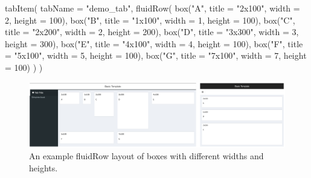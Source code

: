 \documentclass[
  oneside]{book}
\newenvironment{Shaded}{\begin{snugshade}}{\end{snugshade}}
\newcommand{\AttributeTok}[1]{\textcolor[rgb]{0.77,0.63,0.00}{#1}}
\newcommand{\DecValTok}[1]{\textcolor[rgb]{0.00,0.00,0.81}{#1}}
\newcommand{\FunctionTok}[1]{\textcolor[rgb]{0.00,0.00,0.00}{#1}}
\newcommand{\NormalTok}[1]{#1}
\newcommand{\StringTok}[1]{\textcolor[rgb]{0.31,0.60,0.02}{#1}}
\begin{document}
\begin{Shaded}
\begin{Highlighting}[]
\FunctionTok{tabItem}\NormalTok{(}
    \AttributeTok{tabName =} \StringTok{"demo\_tab"}\NormalTok{,}
    \FunctionTok{fluidRow}\NormalTok{(}
      \FunctionTok{box}\NormalTok{(}\StringTok{"A"}\NormalTok{, }\AttributeTok{title =} \StringTok{"2x100"}\NormalTok{, }\AttributeTok{width =} \DecValTok{2}\NormalTok{, }\AttributeTok{height =} \DecValTok{100}\NormalTok{),}
      \FunctionTok{box}\NormalTok{(}\StringTok{"B"}\NormalTok{, }\AttributeTok{title =} \StringTok{"1x100"}\NormalTok{, }\AttributeTok{width =} \DecValTok{1}\NormalTok{, }\AttributeTok{height =} \DecValTok{100}\NormalTok{),}
      \FunctionTok{box}\NormalTok{(}\StringTok{"C"}\NormalTok{, }\AttributeTok{title =} \StringTok{"2x200"}\NormalTok{, }\AttributeTok{width =} \DecValTok{2}\NormalTok{, }\AttributeTok{height =} \DecValTok{200}\NormalTok{),}
      \FunctionTok{box}\NormalTok{(}\StringTok{"D"}\NormalTok{, }\AttributeTok{title =} \StringTok{"3x300"}\NormalTok{, }\AttributeTok{width =} \DecValTok{3}\NormalTok{, }\AttributeTok{height =} \DecValTok{300}\NormalTok{),}
      \FunctionTok{box}\NormalTok{(}\StringTok{"E"}\NormalTok{, }\AttributeTok{title =} \StringTok{"4x100"}\NormalTok{, }\AttributeTok{width =} \DecValTok{4}\NormalTok{, }\AttributeTok{height =} \DecValTok{100}\NormalTok{),}
      \FunctionTok{box}\NormalTok{(}\StringTok{"F"}\NormalTok{, }\AttributeTok{title =} \StringTok{"5x100"}\NormalTok{, }\AttributeTok{width =} \DecValTok{5}\NormalTok{, }\AttributeTok{height =} \DecValTok{100}\NormalTok{),}
      \FunctionTok{box}\NormalTok{(}\StringTok{"G"}\NormalTok{, }\AttributeTok{title =} \StringTok{"7x100"}\NormalTok{, }\AttributeTok{width =} \DecValTok{7}\NormalTok{, }\AttributeTok{height =} \DecValTok{100}\NormalTok{)}
\NormalTok{    )}
\NormalTok{)}
\end{Highlighting}
\end{Shaded}

\begin{figure}

{\centering \includegraphics[width=1\linewidth]{images/sdb_row_layout} 

}

\caption{An example fluidRow layout of boxes with different widths and heights.}\label{fig:sdb-row-layout}
\end{figure}
\end{document}
